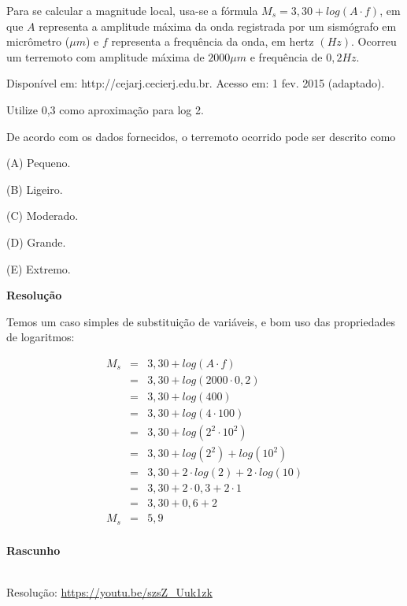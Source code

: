 Para se calcular a magnitude local, usa-se a fórmula $ M_{s} = 3,30 + log(A \cdot f)$, em que $ A $ representa a amplitude máxima da onda registrada por um sismógrafo em micrômetro ($\mu m$) e $ f $ representa a frequência da onda, em hertz $ (Hz) $. Ocorreu um terremoto com amplitude máxima de $ 2 000 \mu m $ e frequência de $ 0,2 Hz $. 

{\scriptsize 
    \begin{flushright}
        Disponível em: http://cejarj.cecierj.edu.br. Acesso em: 1 fev. 2015 (adaptado). 
    \end{flushright}
}

Utilize 0,3 como aproximação para log 2. 

De acordo com os dados fornecidos, o terremoto ocorrido pode ser descrito como

(A) Pequeno.

(B) Ligeiro.

(C) Moderado.

(D) Grande.

(E) Extremo.



\textbf{Resolução}

Temos um caso simples de substituição de variáveis, e bom uso das propriedades de logaritmos:


\begin{eqnarray*}
    M_{s} 	&=& 3,30 + log(A \cdot f) \\
            &=& 3,30 + log(2000 \cdot 0,2) \\
            &=& 3,30 + log(400) \\
            &=& 3,30 + log(4 \cdot 100) \\
            &=& 3,30 + log(2^{2} \cdot 10^{2}) \\
            &=& 3,30 + log(2^{2}) + log(10^{2}) \\
            &=& 3,30 + 2 \cdot log(2) + 2 \cdot log(10) \\
            &=& 3,30 + 2 \cdot 0,3 + 2 \cdot 1 \\
            &=& 3,30 + 0,6 + 2 \\
      M_{s} &=& 5,9 \\
\end{eqnarray*}


\textbf{Rascunho}

\qquad



\begin{center}
    \href{https://youtu.be/S22SHYt4n-o}{
    }\\
    Resolução: \url{https://youtu.be/szsZ_Uuk1zk}
\end{center}



